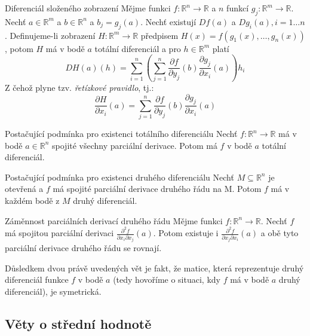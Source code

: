 \begin{vetaN}{Diferenciál složeného zobrazení}
Mějme funkci $f: \mathbb{R}^n \rightarrow \mathbb{R}$ a $n$ funkcí $g_j: \mathbb{R}^m \rightarrow \mathbb{R}$. Nechť $a \in \mathbb{R}^m$ a $b \in \mathbb{R}^n$ a $b_j = g_j(a)$. Nechť existují $Df(a)$ a $Dg_i(a), i = 1 \ldots n$. Definujeme-li zobrazení $H: \mathbb{R}^m \rightarrow \mathbb{R}$ předpisem $H(x) = f(g_1(x), \ldots, g_n(x))$, potom $H$ má v bodě $a$ totální diferenciál a pro $h \in \mathbb{R}^m$ platí
$$DH(a)(h) = \sum_{i = 1}^n\left(\sum_{j = 1}^n\frac{\partial f}{\partial y_j}(b)\frac{\partial g_j}{\partial x_i}(a)\right)h_i$$
Z čehož plyne tzv. \emph{řetízkové pravidlo}, tj.:
$$\frac{\partial H}{\partial x_i}(a)=\sum_{j=1}^n \frac{\partial f}{\partial y_j}(b)\frac{\partial g_j}{\partial x_i}(a)$$
\end{vetaN}

\begin{vetaN}{Postačující podmínka pro existenci totálního diferenciálu}
Nechť $f: \mathbb{R}^n \rightarrow \mathbb{R}$ má v bodě $a \in \mathbb{R}^n$ spojité všechny parciální derivace. Potom má $f$ v bodě $a$ totální diferenciál.
\end{vetaN}

\begin{vetaN}{Postačující podmínka pro existenci druhého diferenciálu}
Nechť $M \subseteq \mathbb{R}^n$ je otevřená a $f$ má spojité parciální derivace druhého řádu na M. Potom $f$ má v každém bodě z $M$ druhý diferenciál.
\end{vetaN}

\begin{vetaN}{Záměnnost parciálních derivací druhého řádu}
Mějme funkci $f: \mathbb{R}^n \rightarrow \mathbb{R}$. Nechť $f$ má spojitou parciální derivaci $\frac{\partial^2f}{\partial x_i \partial x_j}(a)$. Potom existuje i $\frac{\partial^2f}{\partial x_j \partial x_i}(a)$ a obě tyto parciální derivace druhého řádu se rovnají.
\end{vetaN}

\begin{dusledek}
Důsledkem dvou právě uvedených vět je fakt, že matice, která reprezentuje druhý diferenciál funkce $f$ v bodě $a$ (tedy hovoříme o situaci, kdy $f$ má v bodě $a$ druhý diferenciál), je symetrická.
\end{dusledek}

\subsection{Věty o střední hodnotě}

